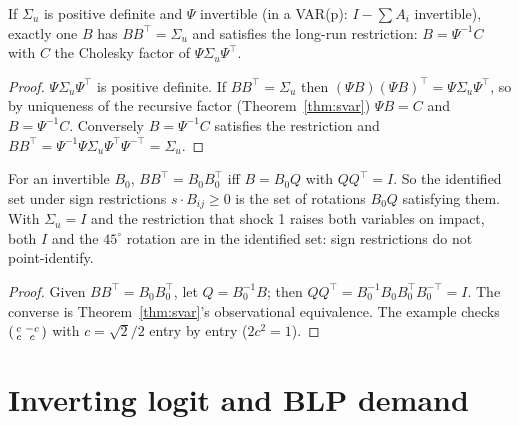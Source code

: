 \begin{theorem}
\label{thm:blanchard-quah}
\leanok
{}
If $\Sigma_u$ is positive definite and $\Psi$ invertible (in a VAR(p): $I - \sum A_i$ invertible), exactly one $B$ has
$BB^\top = \Sigma_u$ and satisfies the long-run restriction: $B = \Psi^{-1}C$ with $C$ the Cholesky factor of
$\Psi\Sigma_u\Psi^\top$.
\end{theorem}
\begin{proof}
\leanok
$\Psi\Sigma_u\Psi^\top$ is positive definite. If $BB^\top = \Sigma_u$ then $(\Psi B)(\Psi B)^\top = \Psi\Sigma_u\Psi^\top$,
so by uniqueness of the recursive factor (Theorem~\ref{thm:svar}) $\Psi B = C$ and $B = \Psi^{-1}C$. Conversely
$B = \Psi^{-1}C$ satisfies the restriction and
$BB^\top = \Psi^{-1}\Psi\Sigma_u\Psi^\top\Psi^{-\top} = \Sigma_u$.
\end{proof}

\begin{theorem}
\label{thm:sign-restrictions}
\leanok
{}
For an invertible $B_0$, $BB^\top = B_0B_0^\top$ iff $B = B_0Q$ with $QQ^\top = I$. So the identified set under sign
restrictions $s\cdot B_{ij}\ge 0$ is the set of rotations $B_0Q$ satisfying them. With $\Sigma_u = I$ and the
restriction that shock 1 raises both variables on impact, both $I$ and the $45^\circ$ rotation are in the identified
set: sign restrictions do not point-identify.
\end{theorem}
\begin{proof}
\leanok
Given $BB^\top = B_0B_0^\top$, let $Q = B_0^{-1}B$; then $QQ^\top = B_0^{-1}B_0B_0^\top B_0^{-\top} = I$. The converse is
Theorem~\ref{thm:svar}'s observational equivalence. The example checks
$\begin{psmallmatrix}c&-c\\c&c\end{psmallmatrix}$ with $c = \sqrt2/2$ entry by entry ($2c^2 = 1$).
\end{proof}

\section{Inverting logit and BLP demand}
\label{sec:blp}

